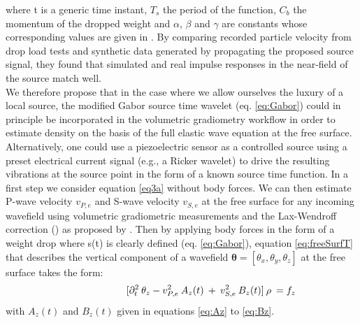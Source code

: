 \documentclass{article}
\begin{document}
	where t is a generic time instant, $T_{s}$ the period of the function, $C_{b}$ the momentum of the dropped weight and $\alpha$, $\beta$ and $\gamma$ are constants whose corresponding values are given in \textcite{colombero2015numerical}. By comparing recorded particle velocity from drop load tests and synthetic data generated by propagating the proposed source signal, they found that simulated and real impulse responses in the near-field of the source match well. \\ %
	 
	We therefore propose that in the case where we allow ourselves the luxury of a local source, the modified Gabor source time wavelet (eq. \ref{eq:Gabor}) could in principle be incorporated in the volumetric gradiometry workflow in order to estimate density on the basis of the full elastic wave equation at the free surface. Alternatively, one could use a piezoelectric sensor as a controlled source using a preset electrical current signal (e.g., a Ricker wavelet) to drive the resulting vibrations at the source point in the form of a known source time function. In a first step we consider equation \eqref{eq3a} without body forces. We can then estimate P-wave velocity $v_{P,e}$ and S-wave velocity $v_{S,e}$ at the free surface for any incoming wavefield using volumetric gradiometric measurements and the Lax-Wendroff correction (\cite{lax1964difference}) as proposed by \textcite{curtis2002volumetric}. Then by applying body forces in the form of a weight drop where s(t) is clearly defined (eq. \ref{eq:Gabor}), equation \eqref{eq:freeSurfT} that describes the vertical component of a wavefield $\bm{\theta}=[\theta_{x}, \theta_{y}, \theta_{z}]$ at the free surface takes the form:
	\begin{align} \shoveright \shoveright \shoveright \shoveright \shoveright \shoveright 
 		[\partial_{t}^{2} \: \theta_{z} - v_{P,e}^{2} \: A_{z}(t) \: + \: v_{S,e}^{2} \: B_{z}(t)]   \: \rho	\: = f_{z}
		\label{eq:freeSurf}   
	\end{align} 
	with $A_{z}(t)$ and $B_{z}(t)$ given in equations \eqref{eq:Az} to \eqref{eq:Bz}. %
\end{document}
